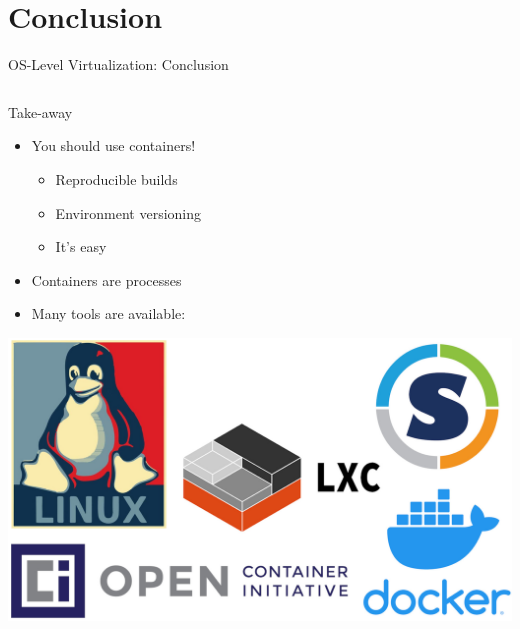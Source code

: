 \documentclass[10pt, compress, aspectratio=169, xcolor={table,usenames,dvipsnames}]{beamer}
\begin{document}
\section{Conclusion}
\label{sec:org8342e79}
\begin{frame}[label={sec:orgc2307d9}]{OS-Level Virtualization: Conclusion}
\begin{columns}
\begin{column}{0.4\columnwidth}
\begin{block}{Take-away}
\begin{itemize}
\item You should \alert{use containers}!
\begin{itemize}
\item Reproducible builds
\item Environment versioning
\item It's \alert{easy}
\end{itemize}
\item Containers are \alert{processes}
\item Many \alert{tools} are available:
\end{itemize}

\begin{center}
\includegraphics[width=.8\columnwidth]{../../img/containers.jpg}
\end{center}
\end{block}
\end{column}


\end{columns}
\end{frame}
\end{document}
